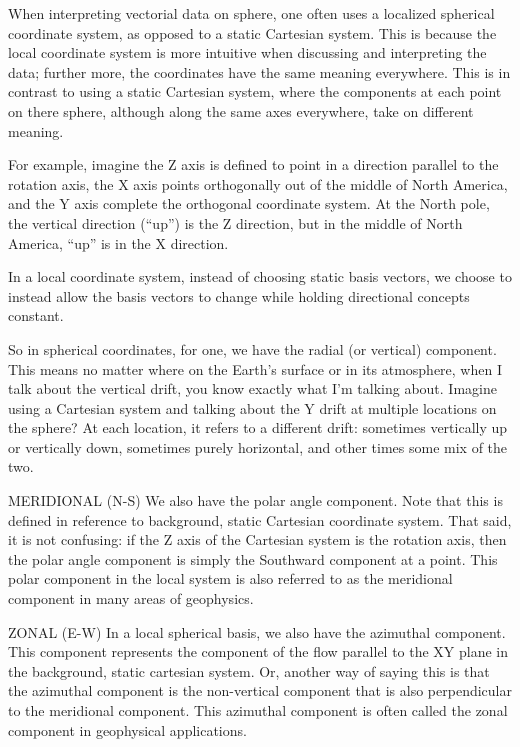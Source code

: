 
When interpreting vectorial data on sphere, one
often uses a localized spherical coordinate system, as opposed to a
static Cartesian system. This is because the local coordinate system is
more intuitive when discussing and interpreting the data; further more,
the coordinates have the same meaning everywhere. This is in contrast to
using a static Cartesian system, where the components at each point on
there sphere, although along the same axes everywhere, take on different
meaning. 

For example, imagine the Z axis is defined to point in a direction
parallel to the rotation axis, the X axis points orthogonally out of the
middle of North America, and the Y axis complete the orthogonal
coordinate system. At the North pole, the vertical direction (``up'') is the Z
direction, but in the middle of North America, ``up'' is in the X
direction. 

In a local coordinate system, instead of choosing static basis vectors,
we choose to instead allow the basis vectors to change while holding
directional concepts constant.

So in spherical coordinates, for one, we have the radial (or vertical)
component. This means no matter where on the Earth's surface or in its
atmosphere, when I talk about the vertical drift, you know exactly what
I'm talking about. Imagine using a Cartesian system and talking about
the Y drift at multiple locations on the sphere? At each location, it
refers to a different drift: sometimes vertically up or vertically down,
sometimes purely horizontal, and other times some mix of the two.

MERIDIONAL (N-S)
We also have the polar angle component. Note that this is defined in
reference to background, static Cartesian coordinate system. That said,
it is not confusing: if the Z axis of the Cartesian system is the
rotation axis, then the polar angle component is simply the Southward
component at a point. This polar component in the local system is also
referred to as the meridional component in many areas of geophysics.

ZONAL (E-W)
In a local spherical basis, we also have the azimuthal component. This
component represents the component of the flow parallel to the XY plane
in the background, static cartesian system. Or, another way of saying
this is that the azimuthal component is the non-vertical component that
is also perpendicular to the meridional component. This azimuthal
component is often called the zonal component in geophysical
applications.


